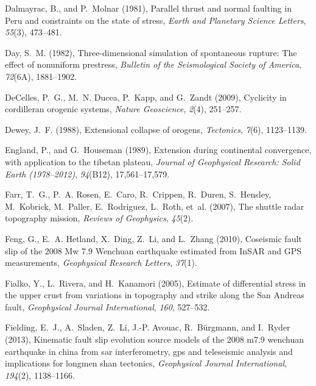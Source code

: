 \documentclass[twocolumn,jgrga]{AGUTeX}
\begin{document}
\begin{article}
{{{\begin{thebibliography}{89}
Dalmayrac, B., and P.~Molnar (1981), Parallel thrust and normal faulting in
  {P}eru and constraints on the state of stress, \textit{Earth and Planetary
  Science Letters}, \textit{55}(3), 473--481.

Day, S.~M. (1982), Three-dimensional simulation of spontaneous rupture: {T}he
  effect of nonuniform prestress, \textit{Bulletin of the Seismological Society
  of America}, \textit{72}(6A), 1881--1902.

DeCelles, P.~G., M.~N. Ducea, P.~Kapp, and G.~Zandt (2009), Cyclicity in
  cordilleran orogenic systems, \textit{Nature Geoscience}, \textit{2}(4),
  251--257.

Dewey, J.~F. (1988), Extensional collapse of orogens, \textit{Tectonics},
  \textit{7}(6), 1123--1139.

England, P., and G.~Houseman (1989), Extension during continental convergence,
  with application to the tibetan plateau, \textit{Journal of Geophysical
  Research: Solid Earth (1978--2012)}, \textit{94}(B12), 17,561--17,579.

Farr, T.~G., P.~A. Rosen, E.~Caro, R.~Crippen, R.~Duren, S.~Hensley,
  M.~Kobrick, M.~Paller, E.~Rodriguez, L.~Roth, et~al. (2007), The shuttle
  radar topography mission, \textit{Reviews of Geophysics}, \textit{45}(2).

Feng, G., E.~A. Hetland, X.~Ding, Z.~Li, and L.~Zhang (2010), Coseismic fault
  slip of the 2008 {M}w 7.9 {W}enchuan earthquake estimated from {I}n{S}{A}{R}
  and {G}{P}{S} measurements, \textit{Geophysical Research Letters},
  \textit{37}(1).

Fialko, Y., L.~Rivera, and H.~Kanamori (2005), Estimate of differential stress
  in the upper crust from variations in topography and strike along the San
  Andreas fault, \textit{Geophysical Journal International}, \textit{160},
  527--532.

Fielding, E.~J., A.~Sladen, Z.~Li, J.-P. Avouac, R.~B{\"u}rgmann, and I.~Ryder
  (2013), Kinematic fault slip evolution source models of the 2008 m7.9
  wenchuan earthquake in china from sar interferometry, gps and teleseismic
  analysis and implications for longmen shan tectonics, \textit{Geophysical
  Journal International}, \textit{194}(2), 1138--1166.


\end{thebibliography}}}}
\end{article}
\end{document}

